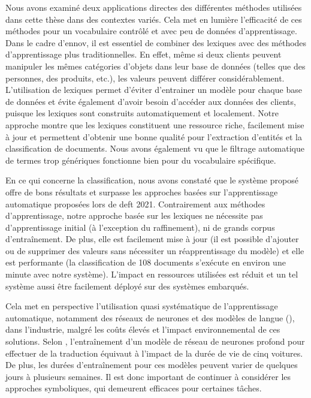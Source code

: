 Nous avons examiné deux applications directes des différentes méthodes utilisées dans cette thèse dans des contextes variés.
Cela met en lumière l'efficacité de ces méthodes pour un vocabulaire contrôlé et avec peu de données d'apprentissage.
Dans le cadre d'\gls{ennov}, il est essentiel de combiner des lexiques avec des méthodes d'apprentissage plus traditionnelles.
En effet, même si deux clients peuvent manipuler les mêmes catégories d'objets dans leur base de données (telles que des personnes, des produits, etc.), les valeurs peuvent différer considérablement.
L'utilisation de lexiques permet d'éviter d'entrainer un modèle pour chaque base de données et évite également d'avoir besoin d'accéder aux données des clients, puisque les lexiques sont construits automatiquement et localement.
Notre approche montre que les lexiques constituent une ressource riche, facilement mise à jour et permettent d'obtenir une bonne qualité pour l'extraction d'entités et la classification de documents.
Nous avons également vu que le filtrage automatique de termes trop génériques fonctionne bien pour du vocabulaire spécifique.

En ce qui concerne la classification, nous avons constaté que le système proposé offre de bons résultats et surpasse les approches basées sur l'apprentissage automatique proposées lors de \gls{deft} 2021.
Contrairement aux méthodes d'apprentissage, notre approche basée sur les lexiques ne nécessite pas d'apprentissage initial (à l'exception du raffinement), ni de grands corpus d'entraînement.
De plus, elle est facilement mise à jour (il est possible d'ajouter ou de supprimer des valeurs sans nécessiter un réapprentissage du modèle) et elle est performante (la classification de \num{108} documents s'exécute en environ une minute avec notre système).
L'impact en ressources utilisées est réduit et un tel système aussi être facilement déployé sur des systèmes embarqués.

Cela met en perspective l'utilisation quasi systématique de l'apprentissage automatique, notamment des réseaux de neurones et des modèles de langue (), dans l'industrie, malgré les coûts élevés et l'impact environnemental de ces solutions.
Selon \cite{strubellEnergyPolicyConsiderations2019}, l'entraînement d'un modèle de réseau de neurones profond  pour effectuer de la traduction équivaut à l'impact de la durée de vie de cinq voitures.
De plus, les durées d'entraînement pour ces modèles peuvent varier de quelques jours à plusieurs semaines.
Il est donc important de continuer à considérer les approches symboliques, qui demeurent efficaces pour certaines tâches.

